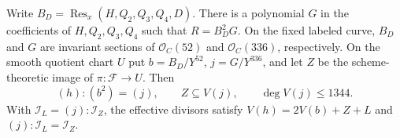 \begin{proposition}
\label{prop:common-line-residual}
Write \(B_D=\operatorname{Res}_x(H,Q_2,Q_3,Q_4,D)\). There is a
polynomial \(G\) in the coefficients of \(H,Q_2,Q_3,Q_4\) such that
\(R=B_D^2G\). On the fixed labeled curve, \(B_D\) and \(G\) are invariant
sections of \(\mathcal O_C(52)\) and \(\mathcal O_C(336)\), respectively.
On the smooth quotient chart \(U\) put
\(b=B_D/Y^{52}\), \(j=G/Y^{336}\), and let \(Z\) be the scheme-theoretic
image of \(\pi:\mathcal F\to U\). Then
\[
   (h):(b^2)=(j),\qquad Z\subseteq V(j),\qquad \deg V(j)\le 1344.
\]
With \(\mathcal I_L=(j):\mathcal I_Z\), the effective divisors satisfy
\(V(h)=2V(b)+Z+L\) and \((j):\mathcal I_L=\mathcal I_Z\).
\end{proposition}

